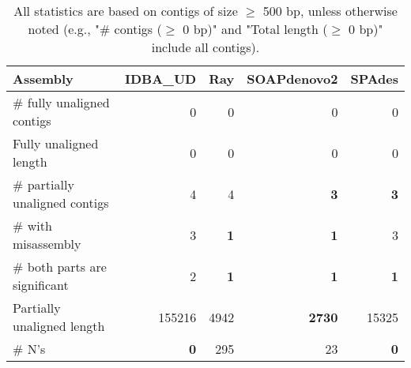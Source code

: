 \documentclass[12pt,a4paper]{article}
\begin{document}
\begin{table}[ht]
\begin{center}
\caption{All statistics are based on contigs of size $\geq$ 500 bp, unless otherwise noted (e.g., "\# contigs ($\geq$ 0 bp)" and "Total length ($\geq$ 0 bp)" include all contigs).}
\begin{tabular}{|l*{4}{|r}|}
\hline
Assembly & IDBA\_UD & Ray & SOAPdenovo2 & SPAdes \\ \hline
\# fully unaligned contigs & 0 & 0 & 0 & 0 \\ \hline
Fully unaligned length & 0 & 0 & 0 & 0 \\ \hline
\# partially unaligned contigs & 4 & 4 & {\bf 3} & {\bf 3} \\ \hline
\hspace{5mm}\# with misassembly & 3 & {\bf 1} & {\bf 1} & 3 \\ \hline
\hspace{5mm}\# both parts are significant & 2 & {\bf 1} & {\bf 1} & {\bf 1} \\ \hline
Partially unaligned length & 155216 & 4942 & {\bf 2730} & 15325 \\ \hline
\# N's & {\bf 0} & 295 & 23 & {\bf 0} \\ \hline
\end{tabular}
\end{center}
\end{table}
\end{document}
